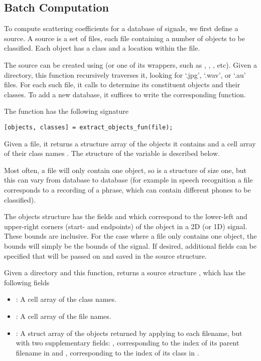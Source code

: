 \documentclass[twocolumn]{article}
\begin{document}
\subsection{Batch Computation}

To compute scattering coefficients for a database of signals, we first define a source. A source is a set of files, each file containing a number of objects to be classified. Each object has a class and a location within the file.

The source can be created using  (or one of its wrappers, such as , , , etc). Given a directory, this function recursively traverses it, looking for `.jpg', `.wav', or `.au' files. For each such file, it calls  to determine its constituent objects and their classes. To add a new database, it suffices to write the corresponding  function.

The  function has the following signature
\begin{lstlisting}
[objects, classes] = extract_objects_fun(file);
\end{lstlisting}
Given a file, it returns a structure array  of the objects it contains and a cell array of their class names . The structure of the  variable is described below.

Most often, a file will only contain one object, so  is a  structure of size one, but this can vary from database to database (for example in speech recognition a file corresponds to a recording of a phrase, which can contain different phones to be classified).

The objects structure has the fields  and  which correspond to the lower-left and upper-right corners (start- and endpoints) of the object in a 2D (or 1D) signal. These bounds are inclusive. For the case where a file only contains one object, the bounds will simply be the bounds of the signal. If desired, additional fields can be specified that will be passed on and saved in the source structure.

Given a directory and this function,  returns a source structure , which has the following fields
\begin{itemize}
	\item {}: A cell array of the class names.
	\item {}: A cell array of the file names.
	\item {}: A struct array of the objects returned by applying  to each filename, but with two supplementary fields: , corresponding to the index of its parent filename in  and , corresponding to the index of its class in .
\end{itemize}
\end{document}
